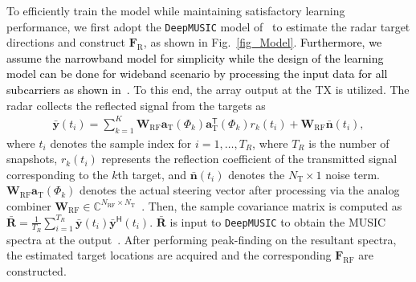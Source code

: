 \documentclass[journal,10pt]{IEEEtran}
\begin{document}
	To efficiently train the model while maintaining satisfactory learning performance, we first adopt the \texttt{DeepMUSIC} model of~\cite{elbir_DL_MUSIC} to estimate the radar target directions and construct $\mathbf{F}_\mathrm{R}$, as shown in Fig.~\ref{fig_Model}. \textcolor{black}{Furthermore, we assume the narrowband model for simplicity while the design of the learning model can be done for wideband scenario by processing the input data for all subcarriers as shown in~\cite{elbir2019online}.} To this end, the array output at the TX is utilized.  The radar collects the reflected signal from the targets as
	\begin{align}
	\bar{\mathbf{y}}(t_i) = \sum_{k = 1}^{K}\mathbf{W}_\mathrm{RF}{\mathbf{a}}_\mathrm{T}(\Phi_k){\mathbf{a}}_\mathrm{T}^\textsf{T}(\Phi_k) {r}_k(t_i) + \mathbf{W}_\mathrm{RF}\bar{\mathbf{n}}(t_i),
	\end{align}
	where $t_i$ denotes the sample index for $i = 1,\dots, T_R$, where $T_R$ is the number of snapshots, $r_k(t_i)$ represents the reflection coefficient of the transmitted  signal corresponding to the $k$th target, and $\bar{\mathbf{n}}(t_i)$ denotes the $N_\mathrm{T}\times 1$ noise term. $\mathbf{W}_\mathrm{RF}{\mathbf{a}}_\mathrm{T}(\Phi_k)$ denotes the actual steering vector after processing via the analog combiner $\mathbf{W}_\mathrm{RF}\in \mathbb{C}^{N_\mathrm{RF}\times N_\mathrm{T}}$~\cite{radarCommSurvey}. Then, the sample covariance matrix is computed as $\bar{\mathbf{R}} = \frac{1}{T_R} \sum_{i = 1}^{T_R} \bar{\mathbf{y}}(t_i)\bar{\mathbf{y}}^\textsf{H}(t_i) $. $\bar{\mathbf{R}}$ is input to \texttt{DeepMUSIC} to obtain the MUSIC spectra at the output~\cite{elbir_DL_MUSIC}. After performing peak-finding on the resultant spectra, the estimated target locations are acquired and the corresponding $\mathbf{F}_\mathrm{RF}$ are constructed.
	
\end{document}
